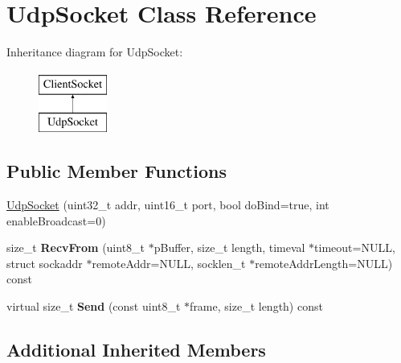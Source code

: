 \hypertarget{class_udp_socket}{\section{Udp\-Socket Class Reference}
\label{class_udp_socket}
}
Inheritance diagram for Udp\-Socket\-:\begin{figure}[H]
\begin{center}
\leavevmode
\includegraphics[height=2.000000cm]{class_udp_socket}
\end{center}
\end{figure}
\subsection*{Public Member Functions}
\begin{DoxyCompactItemize}
\item 
\hyperlink{class_udp_socket_a017a02140e8618ce88f8d8c5a3bf2ba3}{Udp\-Socket} (uint32\-\_\-t addr, uint16\-\_\-t port, bool do\-Bind=true, int enable\-Broadcast=0)
\item 
\hypertarget{class_udp_socket_a1391f69e42186e42966deb59c45f381f}{size\-\_\-t {\bfseries Recv\-From} (uint8\-\_\-t $\ast$p\-Buffer, size\-\_\-t length, timeval $\ast$timeout=N\-U\-L\-L, struct sockaddr $\ast$remote\-Addr=N\-U\-L\-L, socklen\-\_\-t $\ast$remote\-Addr\-Length=N\-U\-L\-L) const }\label{class_udp_socket_a1391f69e42186e42966deb59c45f381f}

\item 
\hypertarget{class_udp_socket_a8985c64bd6d8a3b10c51bb84df253c24}{virtual size\-\_\-t {\bfseries Send} (const uint8\-\_\-t $\ast$frame, size\-\_\-t length) const }\label{class_udp_socket_a8985c64bd6d8a3b10c51bb84df253c24}

\end{DoxyCompactItemize}
\subsection*{Additional Inherited Members}


